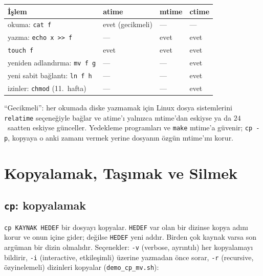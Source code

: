 \documentclass[11pt,a4paper]{article}
\newcommand{\cmd}[1]{\texttt{#1}}
\begin{document}
\begin{center}
\renewcommand{\arraystretch}{1.2}
\begin{tabular}{@{}llll@{}}
\toprule
\textbf{İşlem} & \textbf{atime} & \textbf{mtime} & \textbf{ctime} \\
\midrule
okuma: \cmd{cat f} & evet (gecikmeli) & --- & --- \\
yazma: \cmd{echo x >> f} & --- & evet & evet \\
\cmd{touch f} & evet & evet & evet \\
yeniden adlandırma: \cmd{mv f g} & --- & --- & evet \\
yeni sabit bağlantı: \cmd{ln f h} & --- & --- & evet \\
izinler: \cmd{chmod} (11.~hafta) & --- & --- & evet \\
\bottomrule
\end{tabular}
\end{center}

``Gecikmeli'': her okumada diske yazmamak için Linux dosya sistemlerini \texttt{relatime} seçeneğiyle bağlar ve atime'ı yalnızca mtime'dan eskiyse ya da $24$~saatten eskiyse günceller. Yedekleme programları ve \cmd{make} mtime'a güvenir; \cmd{cp -p}, kopyaya o anki zamanı vermek yerine dosyanın özgün mtime'ını korur.

\section{Kopyalamak, Taşımak ve Silmek}

\subsection{\texttt{cp}: kopyalamak}

\cmd{cp KAYNAK HEDEF} bir dosyayı kopyalar. \texttt{HEDEF} var olan bir dizinse kopya adını korur ve onun içine gider; değilse \texttt{HEDEF} yeni addır. Birden çok kaynak varsa son argüman bir dizin olmalıdır. Seçenekler: \cmd{-v} (verbose, ayrıntılı) her kopyalamayı bildirir, \cmd{-i} (interactive, etkileşimli) üzerine yazmadan önce sorar, \cmd{-r} (recursive, özyinelemeli) dizinleri kopyalar (\cmd{demo\_cp\_mv.sh}):
\end{document}
